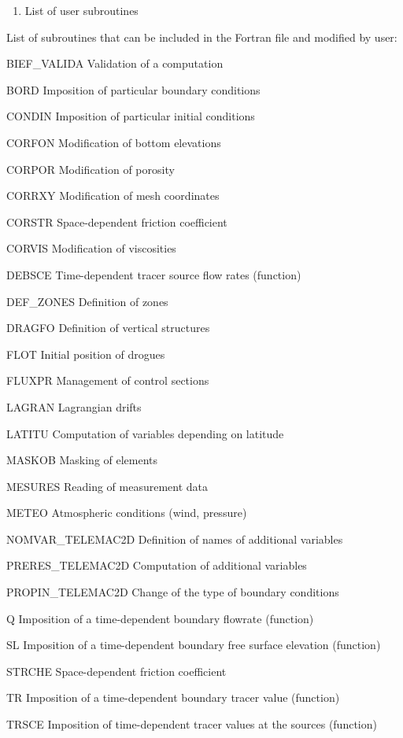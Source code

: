 \documentclass{article} %
\begin{document}
\begin{enumerate}
\item   List of user subroutines
\end{enumerate}

 List of subroutines that can be included in the Fortran file and modified by user:



 BIEF\_VALIDA Validation of a computation

 BORD Imposition of particular boundary conditions

 CONDIN Imposition of particular initial conditions

 CORFON Modification of bottom elevations

 CORPOR Modification of porosity

 CORRXY Modification of mesh coordinates

 CORSTR Space-dependent friction coefficient

 CORVIS Modification of viscosities

 DEBSCE Time-dependent tracer source flow rates (function)

 DEF\_ZONES Definition of zones

 DRAGFO Definition of vertical structures

 FLOT Initial position of drogues

 FLUXPR Management of control sections

 LAGRAN Lagrangian drifts

 LATITU Computation of variables depending on latitude

 MASKOB Masking of elements

 MESURES Reading of measurement data

 METEO Atmospheric conditions (wind, pressure)

 NOMVAR\_TELEMAC2D Definition of names of additional variables

 PRERES\_TELEMAC2D Computation of additional variables

 PROPIN\_TELEMAC2D Change of the type of boundary conditions

 Q Imposition of a time-dependent boundary flowrate (function)

 SL Imposition of a time-dependent boundary free surface elevation (function)

 STRCHE Space-dependent friction coefficient

 TR Imposition of a time-dependent boundary tracer value (function)

 TRSCE Imposition of time-dependent tracer values at the sources (function)
\end{document}

